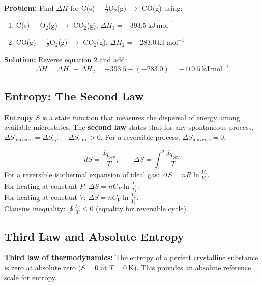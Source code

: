 \documentclass[12pt,a4paper]{article}
\begin{document}
\begin{tcolorbox}[examplebox, title={Solved Example: Hess's Law}]
\textbf{Problem:} Find $\Delta H$ for C(s) + $\tfrac{1}{2}$O$_2$(g) $\to$ CO(g) using:
\begin{enumerate}[leftmargin=*, itemsep=1pt, topsep=1pt]
  \item C(s) + O$_2$(g) $\to$ CO$_2$(g), $\Delta H_1 = -393.5\ \mathrm{kJ\,mol^{-1}}$
  \item CO(g) + $\tfrac{1}{2}$O$_2$(g) $\to$ CO$_2$(g), $\Delta H_2 = -283.0\ \mathrm{kJ\,mol^{-1}}$
\end{enumerate}
\textbf{Solution:} Reverse equation 2 and add:
\[
\Delta H = \Delta H_1 - \Delta H_2 = -393.5 - (-283.0) = -110.5\ \mathrm{kJ\,mol^{-1}}
\]
\end{tcolorbox}

\subsection{Entropy: The Second Law}
\begin{tcolorbox}[defbox]
\textbf{Entropy} $S$ is a state function that measures the dispersal of energy among available microstates. The \textbf{second law} states that for any spontaneous process, $\Delta S_{\mathrm{universe}} = \Delta S_{\mathrm{sys}} + \Delta S_{\mathrm{surr}} > 0$. For a reversible process, $\Delta S_{\mathrm{universe}} = 0$.
\end{tcolorbox}

\begin{tcolorbox}[formulabox, title={Entropy Expressions}]
\[
dS = \frac{\delta q_{\mathrm{rev}}}{T}, \qquad \Delta S = \int_1^2 \frac{\delta q_{\mathrm{rev}}}{T}
\]
For a reversible isothermal expansion of ideal gas: $\Delta S = nR\ln\frac{V_2}{V_1}$.\\
For heating at constant $P$: $\Delta S = nC_P\ln\frac{T_2}{T_1}$.\\
For heating at constant $V$: $\Delta S = nC_V\ln\frac{T_2}{T_1}$.\\
Clausius inequality: $\oint \frac{\delta q}{T} \leq 0$ (equality for reversible cycle).
\end{tcolorbox}

\subsection{Third Law and Absolute Entropy}
\begin{tcolorbox}[defbox]
\textbf{Third law of thermodynamics:} The entropy of a perfect crystalline substance is zero at absolute zero ($S = 0$ at $T = 0\ \mathrm{K}$). This provides an absolute reference scale for entropy.
\end{tcolorbox}
\end{document}
